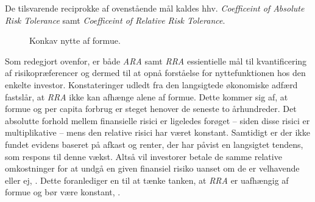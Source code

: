 \documentclass[
  a4paper,
  oneside]{memoir}
\begin{document}
De tilsvarende reciprokke af ovenstående mål kaldes hhv. \emph{Coefficeint of Absolute Risk Tolerance} samt \emph{Coefficeint of Relative Risk Tolerance}.

\begin{figure}[H]
\centering
{}
\caption{Konkav nytte af formue.}
\label{fig:Nyt}
\end{figure}

Som redegjort ovenfor, er både \emph{ARA} samt \emph{RRA} essientielle mål til kvantificering af risikopræferencer og dermed til at opnå forståelse for nyttefunktionen hos den enkelte investor. Konstateringer udledt fra den langsigtede økonomiske adfærd fastslår, at \emph{RRA} ikke kan afhænge alene af formue. Dette kommer sig af, at formue og per capita forbrug er steget henover de seneste to århundreder. Det absolutte forhold mellem finansielle risici er ligeledes forøget -- siden disse risici er multiplikative -- mens den relative risici har været konstant. Samtidigt er der ikke fundet evidens baseret på afkast og renter, der har påvist en langsigtet tendens, som respons til denne vækst. Altså vil investorer betale de samme relative omkostninger for at undgå en given finansiel risiko uanset om de er velhavende eller ej, \citep{CampVic2003}. Dette foranlediger en til at tænke tanken, at \emph{RRA} er uafhængig af formue og bør være konstant, \citep{Chiappori2008}.
\end{document}

